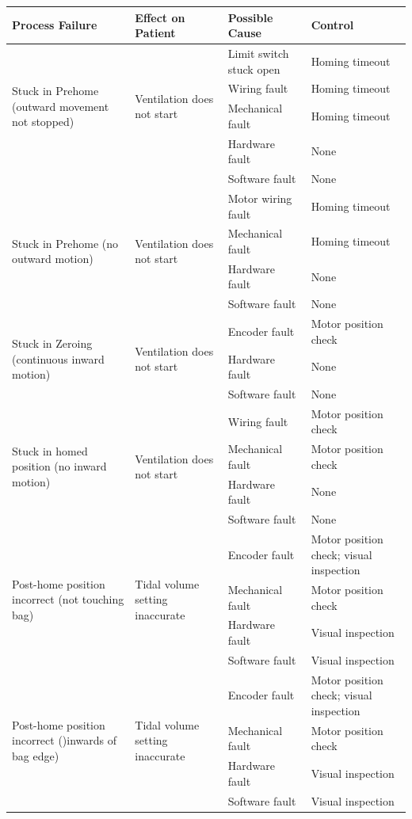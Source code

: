 \documentclass[]{article}
\begin{document}
\begin{center}
\begin{table}[h]
\begin{tabular}{ |p{3.5cm}|p{3cm}| p{3.5cm}| p{3.5cm}|}
	
	\hline
	\textbf{Process Failure}& \textbf{Effect on Patient} &\textbf{Possible Cause} & \textbf{Control}  \\ \hline
	\multirow{4}{3.5cm}{Stuck in Prehome (outward movement not stopped)} & \multirow{4}{3cm}{Ventilation does not start} & Limit switch stuck open & Homing timeout\\ \cline{3-4}
	& & Wiring fault & Homing timeout\\ \cline{3-4}
	& & Mechanical fault & Homing timeout\\ \cline{3-4}
	& & Hardware fault & None\\ \cline{3-4}
	& & Software fault & None\\ \hline
	\multirow{4}{3.5cm}{Stuck in Prehome (no outward motion)} & \multirow{4}{3cm}{Ventilation does not start} & Motor wiring fault & Homing timeout\\ \cline{3-4}
	& & Mechanical fault & Homing timeout\\ \cline{3-4}
	& & Hardware fault & None\\ \cline{3-4}
	& & Software fault & None\\ \hline
	\multirow{3}{3.5cm}{Stuck in Zeroing (continuous inward motion)} & \multirow{3}{3cm}{Ventilation does not start} & Encoder fault & Motor position check\\ \cline{3-4}
	& & Hardware fault & None\\ \cline{3-4}
	& & Software fault & None\\ \hline
	\multirow{4}{3.5cm}{Stuck in homed position (no inward motion)} & \multirow{4}{3cm}{Ventilation does not start} & Wiring fault & Motor position check\\ \cline{3-4}
	& & Mechanical fault & Motor position check\\ \cline{3-4}
	& & Hardware fault & None\\ \cline{3-4}
	& & Software fault & None\\ \hline
	\multirow{4}{3.5cm}{Post-home position incorrect (not touching bag)} & \multirow{4}{3cm}{Tidal volume setting inaccurate} & Encoder fault & Motor position check; visual inspection\\ \cline{3-4}
	& & Mechanical fault & Motor position check\\ \cline{3-4}
	& & Hardware fault & Visual inspection\\ \cline{3-4}
	& & Software fault & Visual inspection\\ \hline
	\multirow{4}{3.5cm}{Post-home position incorrect ()inwards of bag edge)} & \multirow{4}{3cm}{Tidal volume setting inaccurate} & Encoder fault & Motor position check; visual inspection\\ \cline{3-4}
	& & Mechanical fault & Motor position check\\ \cline{3-4}
	& & Hardware fault & Visual inspection\\ \cline{3-4}
	& & Software fault & Visual inspection\\ \hline
	
\end{tabular}
\end{table}	
\end{center}
\end{document}
